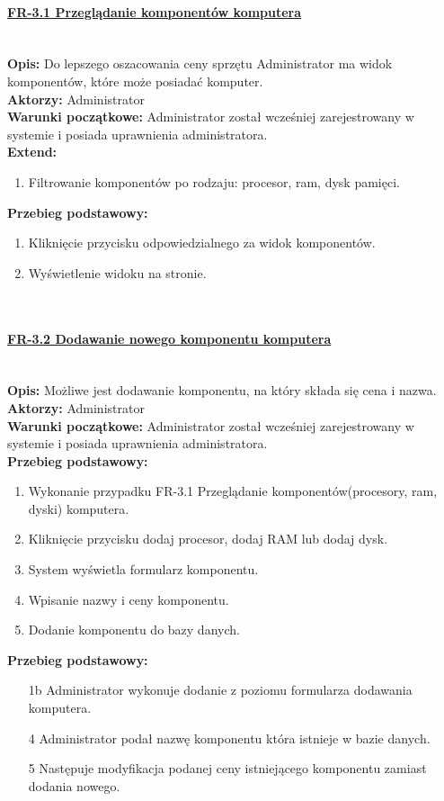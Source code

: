 \paragraph{\underline{FR-3.1 Przeglądanie komponentów komputera}}\mbox{}\\[1mm]
	\noindent\textbf{Opis:} Do lepszego oszacowania ceny sprzętu Administrator ma widok komponentów, które może posiadać komputer.\\
	\noindent\textbf{Aktorzy:} Administrator\\
	\textbf{Warunki początkowe:} Administrator został wcześniej zarejestrowany w systemie i posiada uprawnienia administratora.\\
	\textbf{Extend:}
    \begin{enumerate}[noparskip]
		\item Filtrowanie komponentów po rodzaju: procesor, ram, dysk pamięci.
	\end{enumerate}
  \textbf{Przebieg podstawowy:}
	\begin{enumerate}[noparskip]
		\item Kliknięcie przycisku odpowiedzialnego za widok komponentów.
		\item Wyświetlenie widoku na stronie.
  \end{enumerate} \mbox{}\\[-11mm]

\paragraph{\underline{FR-3.2 Dodawanie nowego komponentu komputera}}\mbox{}\\[1mm]
	\noindent\textbf{Opis:} Możliwe jest dodawanie komponentu, na który składa się cena i nazwa.\\
	\noindent\textbf{Aktorzy:} Administrator\\
	\textbf{Warunki początkowe:} Administrator został wcześniej zarejestrowany w systemie i posiada uprawnienia administratora.\\
  \textbf{Przebieg podstawowy:}
  \begin{enumerate}[noparskip]
		\item Wykonanie przypadku FR-3.1 Przeglądanie komponentów(procesory, ram, dyski) komputera.
		\item Kliknięcie przycisku dodaj procesor, dodaj RAM lub dodaj dysk.
		\item System wyświetla formularz komponentu.
		\item Wpisanie nazwy i ceny komponentu.
		\item Dodanie komponentu do bazy danych.
  \end{enumerate}
  \textbf{Przebieg podstawowy:}
  \begin{enumerate}[noparskip]
		\item[1b] Administrator wykonuje dodanie z poziomu formularza dodawania komputera.
		\item[4] Administrator podał nazwę komponentu która istnieje w bazie danych.
		\item[5] Następuje modyfikacja podanej ceny istniejącego komponentu zamiast dodania nowego.
  \end{enumerate} \mbox{}\\[-11mm]


